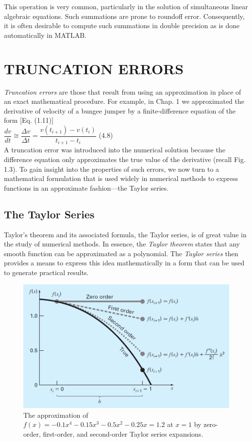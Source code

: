 \documentclass[../main.tex]{subfiles}
\begin{document}
\noindent
This operation is very common, particularly in the solution of simultaneous linear algebraic
equations. Such summations are prone to roundoff error. Consequently, it is often desirable to
compute such summations in double precision as is done automatically in MATLAB.\\
\bigskip

\section[TRUNCATION ERRORS]{TRUNCATION ERRORS}
\noindent
\emph{Truncation errors} are those that result from using an approximation in place of an exact
mathematical procedure. For example, in Chap. 1 we approximated the derivative of velocity
of a bungee jumper by a finite-difference equation of the form [Eq. (1.11)]\\

$\dfrac{dv}{dt} \cong \dfrac{\Delta v}{\Delta t} = \dfrac{v(t_{i+1})-v(t_i)}{t_{i+1}-t_i}$
\hfill
(4.8)\\

\noindent
A truncation error was introduced into the numerical solution because the difference equation
only approximates the true value of the derivative (recall Fig. 1.3). To gain insight into
the properties of such errors, we now turn to a mathematical formulation that is used widely
in numerical methods to express functions in an approximate fashion---the Taylor series.\\

\subsection{The Taylor Series}
\noindent
Taylor's theorem and its associated formula, the Taylor series, is of great value in the study
of numerical methods. In essence, the \emph{Taylor theorem} states that any smooth function can
be approximated as a polynomial. The \emph{Taylor series} then provides a means to express this
idea mathematically in a form that can be used to generate practical results.\\
\bigskip

\begin{figure}[h]
    \includegraphics[width=0.8\linewidth]{./images/fig_4_7}
    \caption{The approximation of $f(x)=-0.1x^4 - 0.15x^3 - 0.5x^2 - 0.25x =1.2$ at $x = 1$ by
    zero-order, first-order, and second-order Taylor series expansions.}
\end{figure}
\bigskip
\end{document}
